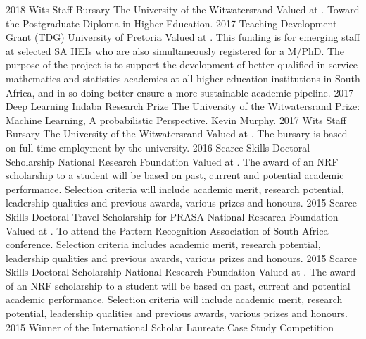 \documentclass[]{friggeri-cv} %
\begin{document}
\begin{entrylist}
\entry
{2018}
{Wits Staff Bursary}
{The University of the Witwatersrand}
{Valued at {\bf \color{ForestGreen}{R40 000}}. Toward the Postgraduate Diploma {\normalfont in Higher Education}.}
\entry
{2017}
{Teaching Development Grant (TDG)}
{University of Pretoria}
{Valued at {\bf \color{ForestGreen}{R50 000}}. This funding is for emerging staff at selected SA HEIs who are also simultaneously registered for a M/PhD. The purpose of the project is to support the development of better qualified in-service mathematics and statistics academics at all higher education institutions in South Africa, and in so doing better ensure a more sustainable academic pipeline.}
\entry
{2017}
{Deep Learning Indaba Research Prize}
{The University of the Witwatersrand}
{Prize: Machine Learning, A probabilistic Perspective. Kevin Murphy.}
\entry
{2017}
{Wits Staff Bursary}
{The University of the Witwatersrand}
{Valued at {\bf \color{ForestGreen}{R40 000}}. The bursary is based on full-time employment by the university.}
\entry
{2016}
{Scarce Skills Doctoral Scholarship}
{National Research Foundation}
{Valued at {\bf \color{ForestGreen}{R110 000}}. The award of an NRF scholarship to a student will be based on past, current and potential academic performance. Selection criteria will include academic merit, research potential, leadership qualities and previous awards, various prizes and honours.}
\entry
{2015}
{Scarce Skills Doctoral Travel Scholarship for PRASA}
{National Research Foundation}
{Valued at {\bf \color{ForestGreen}{R7 993}}. To attend the Pattern Recognition Association of South Africa conference. Selection criteria includes academic merit, research potential, leadership qualities and previous awards, various prizes and honours.}
\entry
{2015}
{Scarce Skills Doctoral Scholarship}
{National Research Foundation}
{Valued at {\bf \color{ForestGreen}{R100 000}}. The award of an NRF scholarship to a student will be based on past, current and potential academic performance. Selection criteria will include academic merit, research potential, leadership qualities and previous awards, various prizes and honours.}
\entry
{2015}
{Winner of the International Scholar Laureate Case Study Competition}

\end{entrylist}
\end{document}
